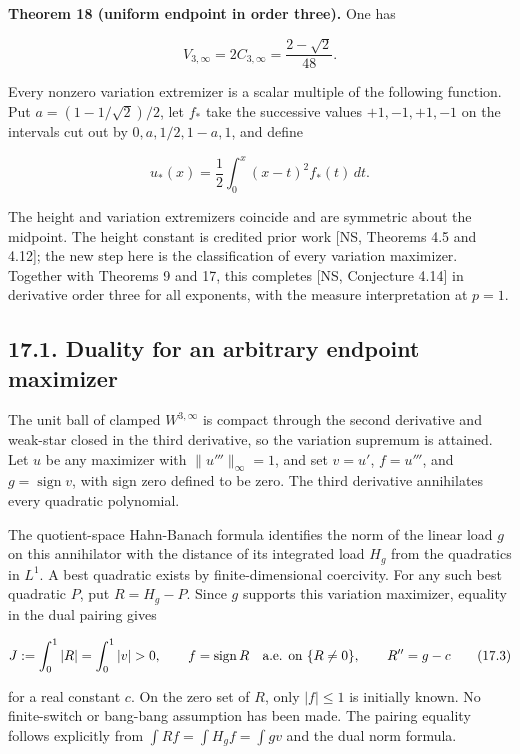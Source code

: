 \documentclass[11pt]{article}
\begin{document}
\textbf{Theorem 18 (uniform endpoint in order three).} One has

\[
V_{3,\infty}=2C_{3,\infty}=\frac{2-\sqrt2}{48}.
\tag{17.1}
\]

Every nonzero variation extremizer is a scalar multiple of the following
function. Put \(a=(1-1/\sqrt2)/2\), let \(f_*\) take the successive
values \(+1,-1,+1,-1\) on the intervals cut out by \(0,a,1/2,1-a,1\),
and define

\[
u_*(x)=\frac12\int_0^x(x-t)^2f_*(t)\,dt.
\tag{17.2}
\]

The height and variation extremizers coincide and are symmetric about
the midpoint. The height constant is credited prior work {[}NS, Theorems
4.5 and 4.12{]}; the new step here is the classification of every
variation maximizer. Together with Theorems 9 and 17, this completes
{[}NS, Conjecture 4.14{]} in derivative order three for all exponents,
with the measure interpretation at \(p=1\).

\subsection{17.1. Duality for an arbitrary endpoint
maximizer}\label{duality-for-an-arbitrary-endpoint-maximizer}

The unit ball of clamped \(W^{3,\infty}\) is compact through the second
derivative and weak-star closed in the third derivative, so the
variation supremum is attained. Let \(u\) be any maximizer with
\(\|u'''\|_\infty=1\), and set \(v=u'\), \(f=u'''\), and
\(g=\operatorname{sign}v\), with sign zero defined to be zero. The third
derivative annihilates every quadratic polynomial.

The quotient-space Hahn-Banach formula identifies the norm of the linear
load \(g\) on this annihilator with the distance of its integrated load
\(H_g\) from the quadratics in \(L^1\). A best quadratic exists by
finite-dimensional coercivity. For any such best quadratic \(P\), put
\(R=H_g-P\). Since \(g\) supports this variation maximizer, equality in
the dual pairing gives

\[
J:=\int_0^1|R|=\int_0^1|v|>0,
\qquad f=\operatorname{sign}R\quad\hbox{a.e. on }\{R\ne0\},
\qquad R''=g-c
\tag{17.3}
\]

for a real constant \(c\). On the zero set of \(R\), only \(|f|\le1\) is
initially known. No finite-switch or bang-bang assumption has been made.
The pairing equality follows explicitly from
\(\int Rf=\int H_gf=\int gv\) and the dual norm formula.
\end{document}
